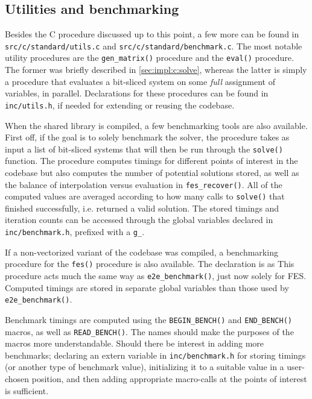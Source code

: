 \subsection{Utilities and benchmarking} \label{sec:impl:c:util_bench}
Besides the C procedure discussed up to this point, a few more can be found in \texttt{src/c/standard/utils.c} and \texttt{src/c/standard/benchmark.c}. The most notable utility procedures are the \texttt{gen\_matrix()} procedure and the \texttt{eval()} procedure. The former was briefly described in \cref{sec:impl:c:solve}, whereas the latter is simply a procedure that evaluates a bit-sliced system on some \textit{full} assignment of variables, in parallel. Declarations for these procedures can be found in \texttt{inc/utils.h}, if needed for extending or reusing the codebase.

When the shared library is compiled, a few benchmarking tools are also available. First off, if the goal is to solely benchmark the solver, the procedure 
takes as input a list of bit-sliced systems that will then be run through the \texttt{solve()} function. The procedure computes timings for different points of interest in the codebase but also computes the number of potential solutions stored, as well as the balance of interpolation versus evaluation in \texttt{fes\_recover()}. All of the computed values are averaged according to how many calls to \texttt{solve()} that finished successfully, i.e. returned a valid solution. The stored timings and iteration counts can be accessed through the global variables declared in \texttt{inc/benchmark.h}, prefixed with a \texttt{g\_}. 

If a non-vectorized variant of the codebase was compiled, a benchmarking procedure for the \texttt{fes()} procedure is also available. The declaration is as
This procedure acts much the same way as \texttt{e2e\_benchmark()}, just now solely for FES. Computed timings are stored in separate global variables than those used by \texttt{e2e\_benchmark()}.

Benchmark timings are computed using the \texttt{BEGIN\_BENCH()} and \texttt{END\_BENCH()} mac\-ros, as well as \texttt{READ\_BENCH()}. The names should make the purposes of the macros more understandable. Should there be interest in adding more benchmarks; declaring an extern variable in \texttt{inc/benchmark.h} for storing timings (or another type of benchmark value), initializing it to a suitable value in a user-chosen position, and then adding appropriate macro-calls at the points of interest is sufficient.
